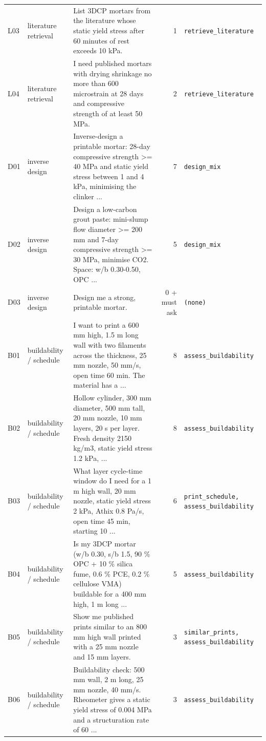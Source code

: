 \begin{tabular}{llp{8.6cm}rl}
L03 & literature retrieval & List 3DCP mortars from the literature whose static yield stress after 60 minutes of rest exceeds 10 kPa. & 1 & \texttt{retrieve\_literature} \\
L04 & literature retrieval & I need published mortars with drying shrinkage no more than 600 microstrain at 28 days and compressive strength of at least 50 MPa. & 2 & \texttt{retrieve\_literature} \\
D01 & inverse design & Inverse-design a printable mortar: 28-day compressive strength >= 40 MPa and static yield stress between 1 and 4 kPa, minimising the clinker ... & 7 & \texttt{design\_mix} \\
D02 & inverse design & Design a low-carbon grout paste: mini-slump flow diameter >= 200 mm and 7-day compressive strength >= 30 MPa, minimise CO2. Space: w/b 0.30-0.50, OPC ... & 5 & \texttt{design\_mix} \\
D03 & inverse design & Design me a strong, printable mortar. & 0 + must ask & \texttt{(none)} \\
B01 & buildability / schedule & I want to print a 600 mm high, 1.5 m long wall with two filaments across the thickness, 25 mm nozzle, 50 mm/s, open time 60 min. The material has a ... & 8 & \texttt{assess\_buildability} \\
B02 & buildability / schedule & Hollow cylinder, 300 mm diameter, 500 mm tall, 20 mm nozzle, 10 mm layers, 20 s per layer. Fresh density 2150 kg/m3, static yield stress 1.2 kPa, ... & 8 & \texttt{assess\_buildability} \\
B03 & buildability / schedule & What layer cycle-time window do I need for a 1 m high wall, 20 mm nozzle, static yield stress 2 kPa, Athix 0.8 Pa/s, open time 45 min, starting 10 ... & 6 & \texttt{print\_schedule, assess\_buildability} \\
B04 & buildability / schedule & Is my 3DCP mortar (w/b 0.30, s/b 1.5, 90 \% OPC + 10 \% silica fume, 0.6 \% PCE, 0.2 \% cellulose VMA) buildable for a 400 mm high, 1 m long ... & 5 & \texttt{assess\_buildability} \\
B05 & buildability / schedule & Show me published prints similar to an 800 mm high wall printed with a 25 mm nozzle and 15 mm layers. & 3 & \texttt{similar\_prints, assess\_buildability} \\
B06 & buildability / schedule & Buildability check: 500 mm wall, 2 m long, 25 mm nozzle, 40 mm/s. Rheometer gives a static yield stress of 0.004 MPa and a structuration rate of 60 ... & 3 & \texttt{assess\_buildability} \\

\end{tabular}
